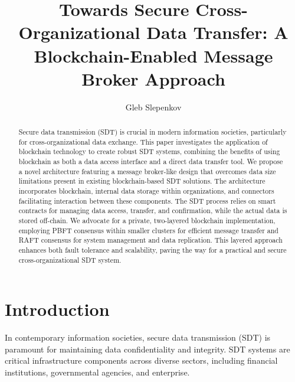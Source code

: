 \documentclass[10pt]{llncs}
\begin{document}
\title{Towards Secure Cross-Organizational Data Transfer: A Blockchain-Enabled Message Broker Approach}
\author{Gleb Slepenkov}

\maketitle

\begin{abstract}
    Secure data transmission (SDT) is crucial in modern information societies, particularly for cross-organizational data exchange. 
    This paper investigates the application of blockchain technology to create robust SDT systems, combining the benefits of using blockchain as both a data access interface and a direct data transfer tool. 
    We propose a novel architecture featuring a message broker-like design that overcomes data size limitations present in existing blockchain-based SDT solutions. 
    The architecture incorporates blockchain, internal data storage within organizations, and connectors facilitating interaction between these components. 
    The SDT process relies on smart contracts for managing data access, transfer, and confirmation, while the actual data is stored off-chain. 
    We advocate for a private, two-layered blockchain implementation, employing PBFT consensus within smaller clusters for efficient message transfer and RAFT consensus for system management and data replication. This layered approach enhances both fault tolerance and scalability, paving the way for a practical and secure cross-organizational SDT system.
    
\end{abstract}

\section{Introduction}

In contemporary information societies, secure data transmission (SDT) is paramount for maintaining data confidentiality and integrity. 
SDT systems are critical infrastructure components across diverse sectors, including financial institutions, governmental agencies, and enterprise.
\end{document}
